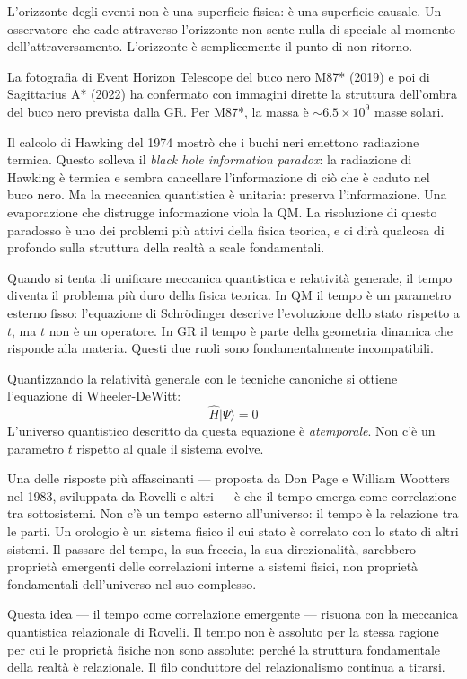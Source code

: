 \documentclass[12pt,a4paper,openany]{book}
\newcommand{\sezione}[1]{\vspace{1.2em}{\large\bfseries #1}\vspace{0.5em}\par}
\begin{document}
L'orizzonte degli eventi non è una superficie fisica: è una superficie causale. Un osservatore che cade attraverso l'orizzonte non sente nulla di speciale al momento dell'attraversamento. L'orizzonte è semplicemente il punto di non ritorno.

La fotografia di Event Horizon Telescope del buco nero M87* (2019) e poi di Sagittarius A* (2022) ha confermato con immagini dirette la struttura dell'ombra del buco nero prevista dalla GR. Per M87*, la massa è $\sim 6.5 \times 10^9$ masse solari.

Il calcolo di Hawking del 1974 mostrò che i buchi neri emettono radiazione termica. Questo solleva il \textit{black hole information paradox}: la radiazione di Hawking è termica e sembra cancellare l'informazione di ciò che è caduto nel buco nero. Ma la meccanica quantistica è unitaria: preserva l'informazione. Una evaporazione che distrugge informazione viola la QM. La risoluzione di questo paradosso è uno dei problemi più attivi della fisica teorica, e ci dirà qualcosa di profondo sulla struttura della realtà a scale fondamentali.

\sezione{Il problema del tempo nella gravità quantistica}

Quando si tenta di unificare meccanica quantistica e relatività generale, il tempo diventa il problema più duro della fisica teorica. In QM il tempo è un parametro esterno fisso: l'equazione di Schrödinger descrive l'evoluzione dello stato rispetto a $t$, ma $t$ non è un operatore. In GR il tempo è parte della geometria dinamica che risponde alla materia. Questi due ruoli sono fondamentalmente incompatibili.

Quantizzando la relatività generale con le tecniche canoniche si ottiene l'equazione di Wheeler-DeWitt:
\[
\hat{H}|\Psi\rangle = 0
\]
L'universo quantistico descritto da questa equazione è \textit{atemporale}. Non c'è un parametro $t$ rispetto al quale il sistema evolve.

Una delle risposte più affascinanti — proposta da Don Page e William Wootters nel 1983, sviluppata da Rovelli e altri — è che il tempo emerga come correlazione tra sottosistemi. Non c'è un tempo esterno all'universo: il tempo è la relazione tra le parti. Un orologio è un sistema fisico il cui stato è correlato con lo stato di altri sistemi. Il passare del tempo, la sua freccia, la sua direzionalità, sarebbero proprietà emergenti delle correlazioni interne a sistemi fisici, non proprietà fondamentali dell'universo nel suo complesso.

Questa idea — il tempo come correlazione emergente — risuona con la meccanica quantistica relazionale di Rovelli. Il tempo non è assoluto per la stessa ragione per cui le proprietà fisiche non sono assolute: perché la struttura fondamentale della realtà è relazionale. Il filo conduttore del relazionalismo continua a tirarsi.
\end{document}
